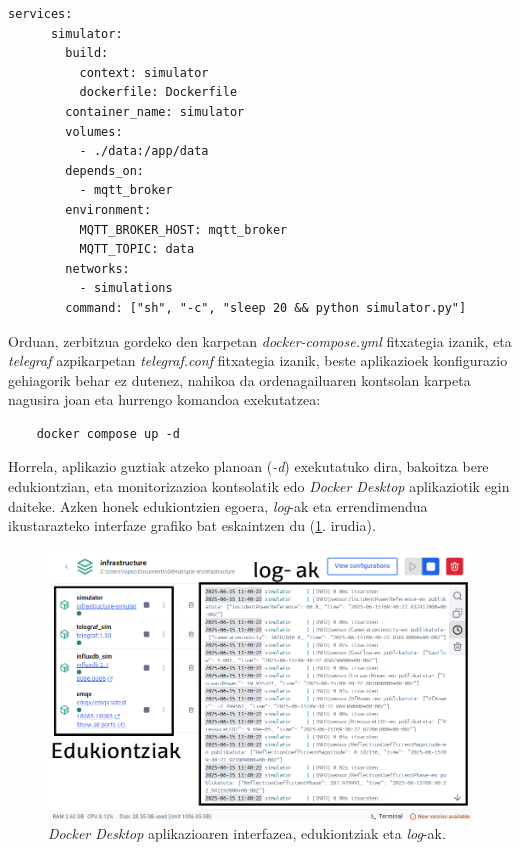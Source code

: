 \documentclass[12pt]{article}
\numberwithin{figure}{section}
\numberwithin{equation}{section}
\begin{document}
\begin{Verbatim}[fontsize=\footnotesize]
    services:
      simulator:
        build:
          context: simulator
          dockerfile: Dockerfile
        container_name: simulator
        volumes:
          - ./data:/app/data
        depends_on:
          - mqtt_broker
        environment:
          MQTT_BROKER_HOST: mqtt_broker
          MQTT_TOPIC: data
        networks:
          - simulations
        command: ["sh", "-c", "sleep 20 && python simulator.py"]
\end{Verbatim}

Orduan, zerbitzua gordeko den karpetan \textit{docker-compose.yml} fitxategia izanik, eta \textit{telegraf} azpikarpetan \textit{telegraf.conf} fitxategia izanik, beste aplikazioek konfigurazio gehiagorik behar ez dutenez, nahikoa da ordenagailuaren kontsolan karpeta nagusira joan eta hurrengo komandoa exekutatzea:

\begin{Verbatim}
    docker compose up -d
\end{Verbatim}

Horrela, aplikazio guztiak atzeko planoan (\textit{-d}) exekutatuko dira, bakoitza bere edukiontzian, eta monitorizazioa kontsolatik edo \textit{Docker Desktop} aplikaziotik egin daiteke. Azken honek edukiontzien egoera, \textit{log}-ak eta errendimendua ikustarazteko interfaze grafiko bat eskaintzen du (\ref{fig:docker-desktop}. irudia).\\

\begin{figure}[h]
    \centering
    \includegraphics[width=\linewidth]{2 - Ingurunea/docker-desktop.png}
    \caption{\textit{Docker Desktop} aplikazioaren interfazea, edukiontziak eta \textit{log}-ak.}
    \label{fig:docker-desktop}
\end{figure}
\end{document}
